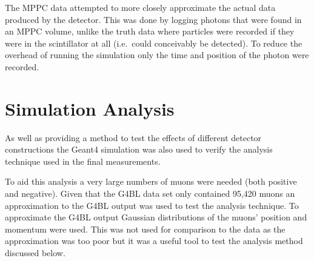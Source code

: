 The MPPC data attempted to more closely approximate the actual data produced by the detector. This was done by logging photons that were found in an MPPC volume, unlike the truth data where particles were recorded if they were in the scintillator at all (i.e.\  could conceivably be detected). To reduce the overhead of running the simulation only the time and position of the photon were recorded.


\section{Simulation Analysis} %
\label{cha:simulation_analysis}

As well as providing a method to test the effects of different detector constructions the Geant4 simulation was also used to verify the analysis technique used in the final measurements.

To aid this analysis a very large numbers of muons were needed (both positive and negative). Given that the G4BL data set only contained 95,420 muons an approximation to the G4BL output was used to test the analysis technique. To approximate the G4BL output Gaussian distributions of the muons' position and momentum were used. This was not used for comparison to the data as the approximation was too poor but it was a useful tool to test the analysis method discussed below.



